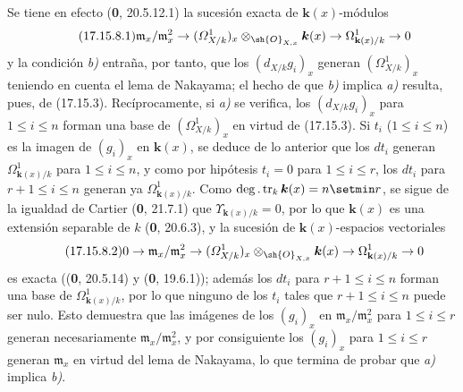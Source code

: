 Se tiene en efecto (\textbf 0, 20.5.12.1) la sucesión exacta de $\boldsymbol k(x)$-módulos
\[
\label{IV.17.15.8.1}
\tag{17.15.8.1}
\mathfrak m_x/\mathfrak m_x^2\to(\varOmega^1_{X/k})_x\otimes_{\sh{O}_{X,x}}\boldsymbol k(x)\to\Omega^1_{\mathbf k(x)/k}\to0
\]
y la condición \emph{b)} entraña, por tanto, que los $(d_{X/k}g_i)_x$ generan $(\varOmega^1_{X/k})_x$ teniendo en cuenta el lema de Nakayama; el hecho de que \emph{b)} implica \emph{a)} resulta, pues, de (17.15.3). Recíprocamente, si \emph{a)} se verifica, los $(d_{X/k}g_i)_x$ para $1\leq i\leq n$ forman una base de $(\varOmega^1_{X/k})_x$ en virtud de (17.15.3). Si $t_i$ ($1\leq i\leq n$) es la imagen de $(g_i)_x$ en $\boldsymbol k(x)$, se deduce de lo anterior que los $dt_i$ generan $\Omega^1_{\mathbf k(x)/k}$ para $1\leq i\leq n$, y como por hipótesis $t_i=0$ para $1\leq i\leq r$, los $dt_i$ para $r+1\leq i\leq n$ generan ya $\Omega^1_{\mathbf k(x)/k}$. Como $\deg.\operatorname{tr}_k \boldsymbol k(x)=n\setmin r$, se sigue de la igualdad de Cartier (\textbf 0, 21.7.1) que $\Upsilon_{\mathbf k(x)/k}=0$, por lo que $\boldsymbol k(x)$ es una extensión separable de $k$ (\textbf 0, 20.6.3), y la sucesión de $\boldsymbol k(x)$-espacios vectoriales
\[
\label{IV.17.15.8.2}
\tag{17.15.8.2}
0\to\mathfrak m_x/\mathfrak m_x^2\to(\varOmega^1_{X/k})_x\otimes_{\sh{O}_{X,x}}\boldsymbol k(x)\to\Omega^1_{\mathbf k(x)/k}\to0
\]
es exacta ((\textbf 0, 20.5.14) y (\textbf 0, 19.6.1)); además los $dt_i$ para $r+1\leq i\leq n$ forman una base de $\Omega^1_{\mathbf k(x)/k}$, por lo que ninguno de los $t_i$ tales que $r+1\leq i\leq n$ puede ser nulo. Esto demuestra que las imágenes de los $(g_i)_x$ en $\mathfrak m_x/\mathfrak m_x^2$ para $1\leq i\leq r$ generan necesariamente $\mathfrak m_x/\mathfrak m_x^2$, y por consiguiente los $(g_i)_x$ para $1\leq i\leq r$ generan $\mathfrak m_x$ en virtud del lema de Nakayama, lo que termina de probar que \emph{a)} implica \emph{b)}.

